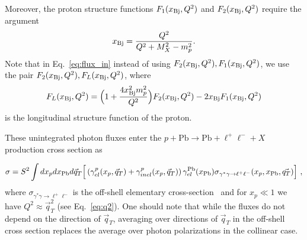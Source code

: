 Moreover, the proton structure functions $F_1(x_{\rm Bj},Q^2)$ and $F_2(x_{\rm Bj},Q^2)$ require the argument
\begin{eqnarray}
x_{\rm Bj} = {Q^2 \over Q^2+M^2_X -m_p^2}.
\end{eqnarray}
Note that in Eq.~\ref{eq:flux_in} instead of using $F_2(x_{\rm Bj},Q^2),F_1(x_{\rm Bj},Q^2)$, 
we use the pair $F_2(x_{\rm Bj},Q^2),F_L(x_{\rm Bj},Q^2)$, where
\begin{eqnarray}
F_L(x_{\rm Bj},Q^2) = \Big( 1 + {4 x_{\rm Bj}^2 m_p^2 \over Q^2} \Big) F_2(x_{\rm Bj},Q^2) - 2 x_{\rm Bj} F_1(x_{\rm Bj},Q^2)
\end{eqnarray}
is the longitudinal structure function of the proton.

These unintegrated photon fluxes enter the $p+\textrm{Pb}\rightarrow \textrm{Pb} + \ell^+\ell^- + X$ production cross section as

\begin{equation}
\sigma = S^2 \int dx_p dx_{\rm Pb} d\vec{q}_T \Big[
\left ( \gamma^{p}_{el}(x_p, \vec{q}_T) + \gamma^{p}_{inel}(x_p,\vec{q}_T) \right)
 \gamma^{\rm Pb}_{el}(x_{\rm Pb})
\sigma_{\gamma^{*}  \gamma \rightarrow \ell^+ \ell^-}(x_p, x_{\rm Pb}, \vec{q_T})  \Big]~,
\label{kt_factorization_formula}
\end{equation}
%
where $\sigma_{\gamma^{*} \gamma \rightarrow \ell^+ \ell^-}$ is the off-shell elementary cross-section~\cite{daSilveira:2014jla} and  for  $x_p \ll 1$ we have $Q^2 \approx \vec{q}_T^2$ (see Eq.~\ref{eq:q2}).
One should note that while the fluxes do not depend on the direction of $\vec{q}_T$, averaging over directions
of $\vec{q}_T$ in the off-shell cross section replaces the average over photon polarizations in the collinear case.
